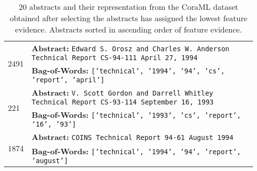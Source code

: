 \begin{table}[!h]
{\begin{tabular}{p{1cm} p{12cm}}
             \midrule
             
             \multirow{2}{*}{2491} &  \textbf{Abstract:} {\tt Edward S. Orosz and Charles W. Anderson Technical Report CS-94-111 April 27, 1994} \\
             & \textbf{Bag-of-Words:} {\tt ['technical', '1994', '94', 'cs', 'report', 'april']} \\
             
             \midrule
             
             \multirow{2}{*}{221} &  \textbf{Abstract:} {\tt V. Scott Gordon and Darrell Whitley Technical Report CS-93-114 September 16, 1993} \\
             & \textbf{Bag-of-Words:} {\tt ['technical', '1993', 'cs', 'report', '16', '93']} \\
             
             \midrule
             
             \multirow{2}{*}{1874} & \textbf{Abstract:} {\tt COINS Technical Report 94-61 August 1994} \\
             & \textbf{Bag-of-Words:} {\tt ['technical', '1994', '94', 'report', 'august']} \\
             \bottomrule
        \end{tabular}
    }
    \vspace{5mm}
    \caption{20 abstracts and their representation from the CoraML dataset obtained after selecting the abstracts \oursacro{} has assigned the lowest feature evidence. Abstracts sorted in ascending order of feature evidence.}
    \label{tab:lowest_evidence_abstracts}
\end{table}
